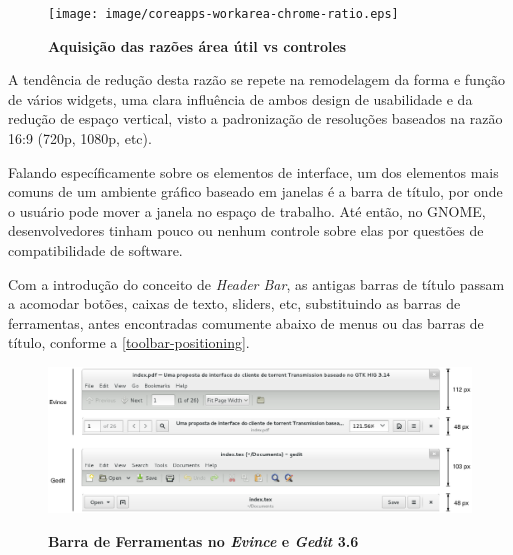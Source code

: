 \begin{table}[htb]
\end{table}

\begin{figure}[!ht]
  \begin{center}
    \caption{\textbf{Aquisição das razões área útil vs controles}}
    \texttt{[image: image/coreapps-workarea-chrome-ratio.eps]}
    \label{coreapps-workarea-vs-chrome}
  \end{center}
\end{figure}


A tendência de redução desta razão se repete na remodelagem da forma e função de
vários widgets, uma clara influência de ambos design de usabilidade e da redução
de espaço vertical, visto a padronização de resoluções baseados na razão 16:9
(720p, 1080p, etc).

Falando específicamente sobre os elementos de interface, um dos elementos mais
comuns de um ambiente gráfico baseado em janelas é a barra de título, por onde o
usuário pode mover a janela no espaço de trabalho. Até então, no GNOME,
desenvolvedores tinham pouco ou nenhum controle sobre elas por questões de
compatibilidade de software.

Com a introdução do conceito de \textit{Header Bar}, as antigas barras de título
passam a acomodar botões, caixas de texto, sliders, etc, substituindo as barras
de ferramentas, antes encontradas comumente abaixo de menus ou das barras de
título, conforme a \autoref{toolbar-positioning}.

\begin{figure}[!ht]
  \begin{center}
    \caption{\textbf{Barra de Ferramentas no \textit{Evince} e \textit{Gedit} 3.6}}
    \includegraphics [width=\textwidth]{image/toolbar-headerbar-comparison.eps}
    \label{toolbar-positioning}
  \end{center}
\end{figure}

